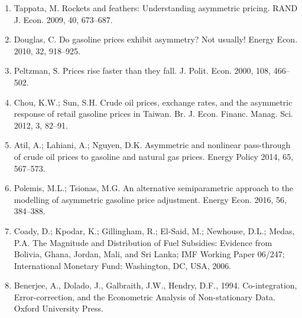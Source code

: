 \documentclass[12pt,twoside]{article}
\begin{document}
\begin{enumerate}
	\item {\fontsize{9pt}{10.8pt}\selectfont Tappata, M. Rockets and feathers: Understanding asymmetric pricing. RAND J. Econ. 2009, 40, 673–687.\par}\par

	\item {\fontsize{9pt}{10.8pt}\selectfont Douglas, C. Do gasoline prices exhibit asymmetry? Not usually! Energy Econ. 2010, 32, 918–925.\par}\par

	\item {\fontsize{9pt}{10.8pt}\selectfont Peltzman, S. Prices rise faster than they fall. J. Polit. Econ. 2000, 108, 466–502.\par}\par

	\item {\fontsize{9pt}{10.8pt}\selectfont Chou, K.W.; Sun, S.H. Crude oil prices, exchange rates, and the asymmetric response of retail gasoline prices in Taiwan. Br. J. Econ. Financ. Manag. Sci. 2012, 3, 82–91.\par}\par

	\item {\fontsize{9pt}{10.8pt}\selectfont Atil, A.; Lahiani, A.; Nguyen, D.K. Asymmetric and nonlinear pass-through of crude oil prices to gasoline and natural gas prices. Energy Policy 2014, 65, 567–573.\par}\par

	\item {\fontsize{9pt}{10.8pt}\selectfont Polemis, M.L.; Tsionas, M.G. An alternative semiparametric approach to the modelling of asymmetric gasoline price adjustment. Energy Econ. 2016, 56, 384–388.\par}\par

	\item {\fontsize{9pt}{10.8pt}\selectfont Coady, D.; Kpodar, K.; Gillingham, R.; El-Said, M.; Newhouse, D.L.; Medas, P.A. The Magnitude and Distribution of Fuel Subsidies: Evidence from Bolivia, Ghana, Jordan, Mali, and Sri Lanka; IMF Working Paper 06/247; International Monetary Fund: Washington, DC, USA, 2006.\par}\par

	\item {\fontsize{9pt}{10.8pt}\selectfont Benerjee, A., Dolado, J., Galbraith, J.W., Hendry, D.F., 1994. Co-integration, Error-correction, and the Econometric Analysis of Non-stationary Data. Oxford University Press.\par}\par


\end{enumerate}
\end{document}
